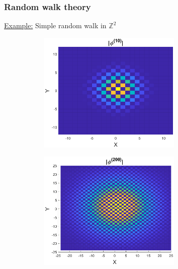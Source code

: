 \documentclass{beamer}
\theoremstyle{definition}
\begin{document}
\begin{frame}
\frametitle{Random walk theory}
\noindent \underline{Example:} Simple random walk in $\mathbb{Z}^2$

\begin{figure}
	\begin{subfigure}{0.49\textwidth}
		\centering
		\includegraphics[width=0.75\textwidth]{convolve_1.eps}
	\end{subfigure}
	\begin{subfigure}{0.49\textwidth}
		\centering
		\includegraphics[width=0.75\textwidth]{convolve_2.eps}
	\end{subfigure}
\end{figure}
\vspace{-15pt}
\begin{figure}
	\begin{subfigure}{0.49\textwidth}
		\centering

\end{subfigure}
\end{figure}
\end{frame}
\end{document}
